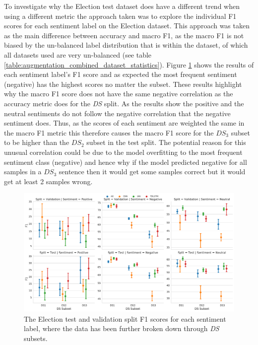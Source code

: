 To investigate why the Election test dataset does have a different trend when using a different metric the approach taken was to explore the individual F1 scores for each sentiment label on the Election dataset. This approach was taken as the main difference between accuracy and macro F1, as the macro F1 is not biased by the un-balanced label distribution that is within the dataset, of which all datasets used are very un-balanced (see table \ref{table:augmentation_combined_dataset_statistics}). Figure \ref{fig:aug_baseline_sentiment_f1_ds_election} shows the results of each sentiment label's F1 score and as expected the most frequent sentiment (negative) has the highest scores no matter the subset. These results highlight why the macro F1 score does not have the same negative correlation as the accuracy metric does for the \textit{DS} split. As the results show the positive and the neutral sentiments do not follow the negative correlation that the negative sentiment does. Thus, as the scores of each sentiment are weighted the same in the macro F1 metric this therefore causes the macro F1 score for the $DS_3$ subset to be higher than the $DS_2$ subset in the test split. The potential reason for this unusual correlation could be due to the model overfitting to the most frequent sentiment class (negative) and hence why if the model predicted negative for all samples in a $DS_3$ sentence then it would get some samples correct but it would get at least 2 samples wrong.

\begin{figure}[h!]
    \centering
    \includegraphics[scale=0.4]{images/augmentation/methods_performance/baseline/sentiment_f1_ds_election.pdf}
    \caption{The Election test and validation split F1 scores for each sentiment label, where the data has been further broken down through \textit{DS} subsets.}
    \label{fig:aug_baseline_sentiment_f1_ds_election}
\end{figure}

